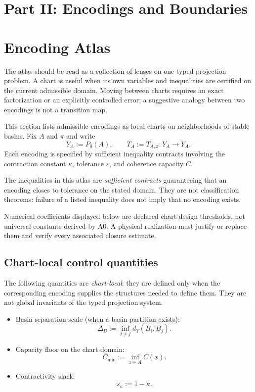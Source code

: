 \documentclass[11pt]{article}
\theoremstyle{plain}
\theoremstyle{plain}
\begin{document}
\section*{Part II: Encodings and Boundaries}
\section{Encoding Atlas}

The atlas should be read as a collection of lenses on one typed projection
problem.  A chart is useful when its own variables and inequalities are
certified on the current admissible domain.  Moving between charts requires
an exact factorization or an explicitly controlled error; a suggestive
analogy between two encodings is not a transition map.

This section lists admissible encodings as local charts on neighborhoods
of stable basins.  Fix $A$ and $\pi$ and write
\[
Y_A:=P_0(A),
\qquad T_A:=T_{A,\pi}:Y_A\to Y_A .
\]
Each encoding is specified by sufficient inequality contracts involving
the contraction constant $\kappa$, tolerance $\varepsilon$, and
coherence capacity $C$.
\begin{remark}
The inequalities in this atlas are \emph{sufficient contracts} guaranteeing that an encoding closes
to tolerance on the stated domain. They are not classification theorems: failure of a listed
inequality does not imply that no encoding exists.
\end{remark}
\begin{remark}
Numerical coefficients displayed below are declared chart-design thresholds,
not universal constants derived by A0.  A physical realization must justify
or replace them and verify every associated closure estimate.
\end{remark}

\subsection{Chart-local control quantities}

The following quantities are \emph{chart-local}:
they are defined only when the corresponding encoding supplies
the structures needed to define them.
They are not global invariants of the typed projection system.

\begin{itemize}
\item Basin separation scale (when a basin partition exists):
\[
\Delta_B := \inf_{i\neq j} d_Y(B_i,B_j).
\]

\item Capacity floor on the chart domain:
\[
C_{\min} := \inf_{x\in A} C(x).
\]

\item Contractivity slack:
\[
s_\kappa := 1-\kappa.
\]
\end{itemize}
\end{document}
